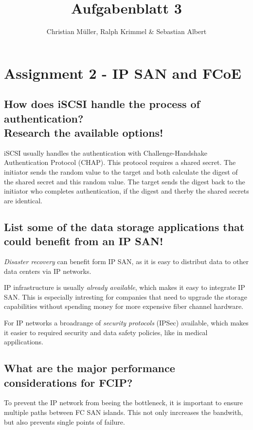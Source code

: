 \documentclass{article}
\title{Aufgabenblatt 3}
\author{Christian Müller, Ralph Krimmel \& Sebastian Albert }
\begin{document}
\maketitle

\section*{Assignment 2 - IP SAN and FCoE}

\subsection{How does iSCSI handle the process of authentication?\\Research the available options!}
	iSCSI usually handles the authentication with Challenge-Handshake Authentication Protocol (CHAP).
	This protocol requires a shared secret.
	The initiator sends the random value to the target 
	and both calculate the digest of the shared secret and this random value.
	The target sends the digest back to the initiator who completes authentication,
	if the digest and therby the shared secrets are identical.

\subsection{List some of the data storage applications that could benefit from an IP SAN!}
	\emph{Disaster recovery} can benefit form IP SAN,
	as it is easy to distribut data to other data centers via IP networks.

	IP infrastructure is usually \emph{already available},
	which makes it easy to integrate IP SAN.
	This is especially intresting for companies that need to upgrade the storage capabilities
	without spending money for more expensive fiber channel hardware.

	For IP networks a broadrange of \emph{security protocols} (IPSec) available,
	which makes it easier to required security and data safety policies,
	like in medical appilications.

\subsection{What are the major performance considerations for FCIP?}
	To prevent the IP network from beeing the bottleneck,
	it is important to ensure multiple paths between FC SAN islands.
	This not only inrcreases the bandwith,
	but also prevents single points of failure.
\end{document}
